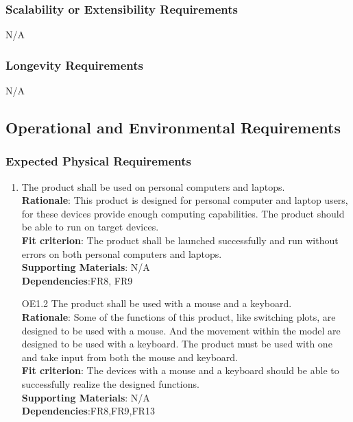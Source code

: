 \documentclass{article}
\begin{document}
\subsubsection{Scalability or Extensibility Requirements}
N/A
\subsubsection{Longevity Requirements}
N/A

\subsection{Operational and Environmental Requirements}
\subsubsection{Expected Physical Requirements}

\begin{enumerate}[OE1.1]
    \item The product shall be used on personal computers and laptops.\\
    \textbf{Rationale}: This product is designed for personal computer and laptop users, for these
     devices provide enough computing capabilities. The product should be able to run on target
      devices.\\
    \textbf{Fit criterion}: The product shall be launched successfully and run without errors on both
     personal computers and laptops.\\
\textbf{Supporting Materials}: N/A\\
\textbf{Dependencies}:FR8, FR9\\
   
    \item[OE1.2] The product shall be used with a mouse and a keyboard.\\
    \textbf{Rationale}: Some of the functions of this product, like switching plots, are designed to be used with a mouse. And the movement within the model are designed to be used with a keyboard. The product must be used with one and take input from both the mouse and keyboard.\\
    \textbf{Fit criterion}: The devices with a mouse and a keyboard should be able to successfully realize the designed functions.\\
\textbf{Supporting Materials}: N/A\\
\textbf{Dependencies}:FR8,FR9,FR13\\

\end{enumerate}
\end{document}
